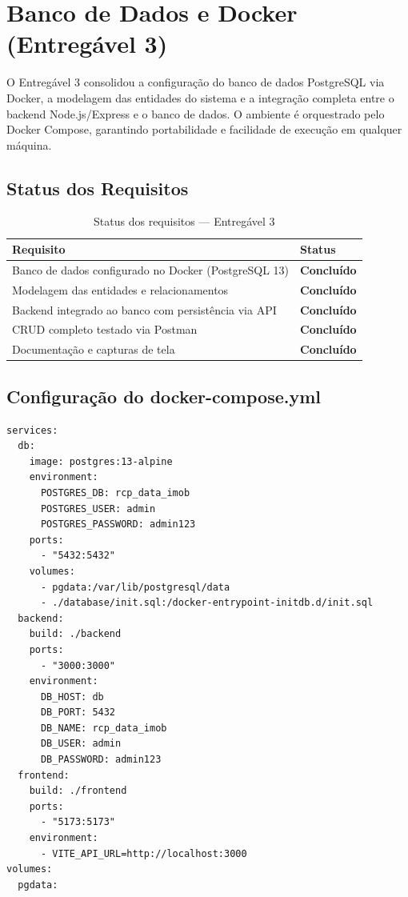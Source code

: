 \documentclass[12pt, a4paper]{article}
\newcommand{\thead}[1]{\cellcolor{tableheader}\color{white}\bfseries #1}
\newcommand{\talt}{\rowcolor{tablerowalt}}
\newcommand{\tok}{\textcolor{successgreen}{\textbf{Concluído}}}
\begin{document}
\section{Banco de Dados e Docker (Entregável 3)}

O Entregável 3 consolidou a configuração do banco de dados PostgreSQL via Docker, a modelagem das entidades do sistema e a integração completa entre o backend Node.js/Express e o banco de dados. O ambiente é orquestrado pelo Docker Compose, garantindo portabilidade e facilidade de execução em qualquer máquina.

\subsection{Status dos Requisitos}

\begin{table}[H]
\centering
\begin{tabularx}{\textwidth}{|X|l|}
\hline
\thead{Requisito} & \thead{Status} \\
\hline
Banco de dados configurado no Docker (PostgreSQL 13) & \tok \\
\talt Modelagem das entidades e relacionamentos & \tok \\
Backend integrado ao banco com persistência via API & \tok \\
\talt CRUD completo testado via Postman & \tok \\
Documentação e capturas de tela & \tok \\
\hline
\end{tabularx}
\caption{Status dos requisitos — Entregável 3}
\end{table}

\subsection{Configuração do docker-compose.yml}

\begin{lstlisting}[language=YAML2]
services:
  db:
    image: postgres:13-alpine
    environment:
      POSTGRES_DB: rcp_data_imob
      POSTGRES_USER: admin
      POSTGRES_PASSWORD: admin123
    ports:
      - "5432:5432"
    volumes:
      - pgdata:/var/lib/postgresql/data
      - ./database/init.sql:/docker-entrypoint-initdb.d/init.sql
  backend:
    build: ./backend
    ports:
      - "3000:3000"
    environment:
      DB_HOST: db
      DB_PORT: 5432
      DB_NAME: rcp_data_imob
      DB_USER: admin
      DB_PASSWORD: admin123
  frontend:
    build: ./frontend
    ports:
      - "5173:5173"
    environment:
      - VITE_API_URL=http://localhost:3000
volumes:
  pgdata:
\end{lstlisting}
\end{document}
